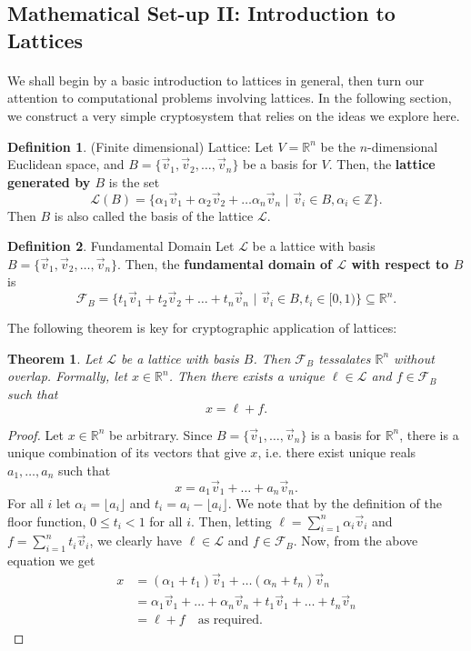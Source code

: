 \documentclass{article}
\newtheorem{theorem}{Theorem}[section]
\theoremstyle{definition}
\newtheorem{definition}{Definition}[section]
\renewcommand{\L}{\mathcal{L}}
\newcommand{\F}{\mathcal{F}}
\newcommand{\Int}{\mathbb{Z}}
\newcommand{\Reals}{\mathbb{R}}
\begin{document}
\subsection{Mathematical Set-up II: Introduction to Lattices}
\paragraph{} We shall begin by a basic introduction to lattices in general, then
turn our attention to computational problems involving lattices. In the
following section, we construct a very simple cryptosystem that relies on the
ideas we explore here.
\begin{definition}{(Finite dimensional) Lattice:}
  Let $V = \Reals^n$ be the $n$-dimensional Euclidean space, and $B = \{\vec{v}_1,
  \vec{v}_2, \hdots, \vec{v}_n\}$ be a basis for $V$. Then, the \textbf{lattice generated by $B$} is the set
  \[
    \L(B) = \{\alpha_1\vec{v}_1 + \alpha_2\vec{v}_2 + \hdots \alpha_n\vec{v}_n\,\,|\,\, \vec{v}_i \in B,
    \alpha_i \in \Int\}.
  \]
  Then $B$ is also called the basis of the lattice $\L$.
\end{definition}
\begin{definition}{Fundamental Domain}
  Let $\L$ be a lattice with basis $B = \{\vec{v}_1, \vec{v}_2, \hdots, \vec{v}_n\}$. Then, the
  \textbf{fundamental domain of $\L$ with respect to $B$} is
  \[
    \F_B = \{t_1\vec{v}_1 + t_2\vec{v}_2 + \hdots + t_n\vec{v}_n \,\,|\,\, \vec{v}_i \in B, t_i \in [0,
    1)\} \subseteq \Reals^n.
  \]
\end{definition}
The following theorem is key for cryptographic application of lattices:
\begin{theorem}
  Let $\L$ be a lattice with basis $B$. Then $\F_B$ tessalates $\Reals^n$
  without overlap. Formally, let $x \in \Reals^n$. Then there exists a unique $\ell \in \L$
  and $f \in \F_B$ such that
\[
  x = \ell + f.
\]
\end{theorem}
\begin{proof}
  Let $x \in \Reals^n$ be arbitrary. Since $B = \{ \vec{v}_1, \hdots, \vec{v}_n \}$ is a basis for $\Reals^n$, there
  is a unique combination of its vectors that give $x$, i.e. there exist unique
  reals $a_1, \hdots, a_n$ such that
  \[
    x = a_1\vec{v}_1 + \hdots + a_n\vec{v}_n.
  \]
  For all $i$ let $\alpha_i = \lfloor a_i \rfloor$ and $t_i = a_i - \lfloor a_i
  \rfloor$. We note that by the definition of the floor function, $0 \leq t_i <
  1$ for all $i$. Then, letting $\ell = \sum_{i = 1}^n \alpha_i\vec{v}_i$ and $f
  = \sum_{i = 1}^n t_i\vec{v}_i$, we clearly have $\ell \in \L$ and $f \in
  \F_B$. Now, from the above equation we get
  \begin{align*}
    x &= (\alpha_1 + t_1)\vec{v}_1 + \hdots (\alpha_n + t_n)\vec{v}_n \\
      &= \alpha_1\vec{v}_1 + \hdots + \alpha_n\vec{v}_n + t_1\vec{v}_1 + \hdots + t_n\vec{v}_n \\
      &= \ell + f \quad \text{as required.}
  \end{align*}
\end{proof}
\end{document}
